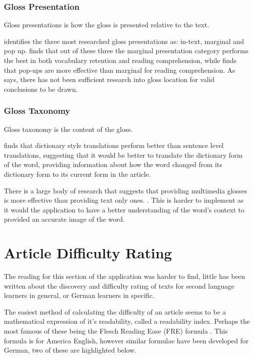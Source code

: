 \subsubsection{Gloss Presentation}

Gloss presentations is how the gloss is presented relative to the text. 

\textcite{chen2016} identifies the three most researched gloss presentations as: in-text, marginal and pop up.  \textcite{abuseileek2008} finds that out of these three the marginal presentation category performs the best in both vocabulary retention and reading comprehension, while \textcite{marefat2016} finds that pop-ups are more effective than marginal for reading comprehension. As \textcite{chen2016} says, there has not been sufficient research into gloss location for valid conclusions to be drawn. 

\subsubsection{Gloss Taxonomy}

Gloss taxonomy is the content of the gloss.

\textcite{gettys2001} finds that dictionary style translations perform better than sentence level translations, suggesting that it would be better to translate the dictionary form of the word, providing information about how the word changed from its dictionary form to its current form in the article. 

There is a large body of research that suggests that providing multimedia glosses is more effective than providing text only ones. \autocite{yoshii2006, kost1999}. This is harder to implement  as it would the application to have a better understanding of the word's context to provided an accurate image of the word. 


\section{Article Difficulty Rating}

The reading for this section of the application was harder to find, little has been written about the discovery and difficulty rating of texts for second language learners in general, or German learners in specific. 

The easiest method of calculating the difficulty of an article seems to be a mathematical expression of it's readability, called a readability index. Perhaps the most famous of these being the Flesch Reading Ease (FRE) formula \autocite{flesch1948}. This formula is for America English, however similar formulae have been developed for German, two of these are highlighted below.

